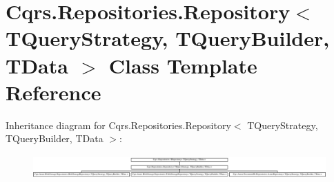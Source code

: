 \hypertarget{classCqrs_1_1Repositories_1_1Repository}{}\section{Cqrs.\+Repositories.\+Repository$<$ T\+Query\+Strategy, T\+Query\+Builder, T\+Data $>$ Class Template Reference}
\label{classCqrs_1_1Repositories_1_1Repository}
Inheritance diagram for Cqrs.\+Repositories.\+Repository$<$ T\+Query\+Strategy, T\+Query\+Builder, T\+Data $>$\+:\begin{figure}[H]
\begin{center}
\leavevmode
\includegraphics[height=0.907618cm]{classCqrs_1_1Repositories_1_1Repository}
\end{center}
\end{figure}
